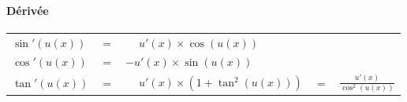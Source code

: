 \documentclass[a4paper]{article}
\begin{document}
				\vspace{-5mm}
				
				\paragraph*{Dérivée}
					\phantom{r}

					\begin{tabular}{lclcl}
						$\sin'(u(x))$ & $=$ & $\phantom{-}u'(x) \times \cos(u(x))$ & & \phantom{\large{$\frac{u'(x)}{\cos^2(u(x))}$}}\\
						$\cos'(u(x))$ & $=$ & $-u'(x) \times \sin(u(x))$ && \phantom{\large{$\frac{u'(x)}{\cos^2(u(x))}$}}\\
						$\tan'(u(x))$ & $=$ & $\phantom{-}u'(x) \times (1 + \tan^2(u(x)))$ & $ = $ & \large{$\frac{u'(x)}{\cos^2(u(x))}$} \\
					\end{tabular}

					\vfill
					\vspace{5mm}


\newpage
\end{document}
